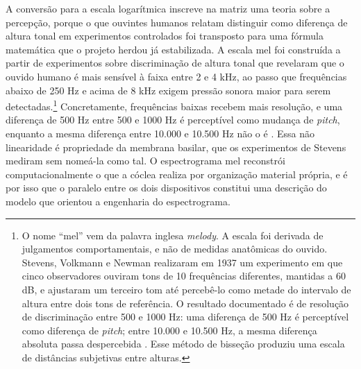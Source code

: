 A conversão para a escala logarítmica inscreve na matriz uma teoria sobre a percepção, porque o que ouvintes humanos relatam distinguir como diferença de altura tonal em experimentos controlados foi transposto para uma fórmula matemática que o projeto herdou já estabilizada. A escala mel foi construída a partir de experimentos sobre discriminação de altura tonal que revelaram que o ouvido humano é mais sensível à faixa entre 2 e 4 kHz, ao passo que frequências abaixo de 250 Hz e acima de 8 kHz exigem pressão sonora maior para serem detectadas.\footnote{O nome \enquote{mel} vem da palavra inglesa \textit{melody}. A escala foi derivada de julgamentos comportamentais, e não de medidas anatômicas do ouvido. Stevens, Volkmann e Newman realizaram em 1937 um experimento em que cinco observadores ouviram tons de 10 frequências diferentes, mantidas a 60 dB, e ajustaram um terceiro tom até percebê-lo como metade do intervalo de altura entre dois tons de referência. O resultado documentado é de resolução de discriminação entre 500 e 1000 Hz: uma diferença de 500 Hz é perceptível como diferença de \textit{pitch}; entre 10.000 e 10.500 Hz, a mesma diferença absoluta passa despercebida \parencite{roberts2020mel}. Esse método de bisseção produziu uma escala de distâncias subjetivas entre alturas.} Concretamente, frequências baixas recebem mais resolução, e uma diferença de 500 Hz entre 500 e 1000 Hz é perceptível como mudança de \textit{pitch}, enquanto a mesma diferença entre 10.000 e 10.500 Hz não o é \parencite{stevens1937scale,stevens1940pitch}. Essa não linearidade é propriedade da membrana basilar, que os experimentos de Stevens mediram sem nomeá-la como tal. O espectrograma mel reconstrói computacionalmente o que a cóclea realiza por organização material própria, e é por isso que o paralelo entre os dois dispositivos constitui uma descrição do modelo que orientou a engenharia do espectrograma.

